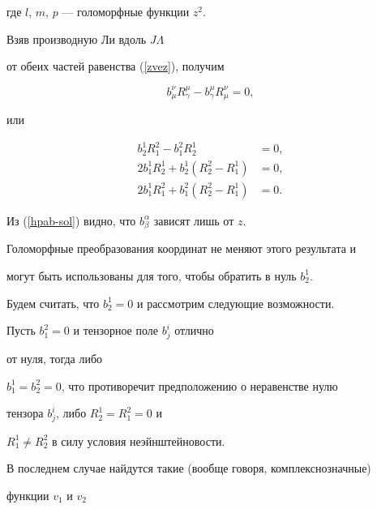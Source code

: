 где $l$, $m$, $p$ --- голоморфные функции $z^2$.


Взяв производную Ли вдоль $J\Lambda$


от обеих частей равенства (\ref{zvez}), получим


\begin{equation}


\label{zvez-b}


b_{\mu}^{\nu} R^{\mu}_{\gamma}-


b_{\gamma}^{\mu} R^{\nu}_{\mu}=0,


\end{equation}


или


\begin{equation}


\begin{split}


\label{zvez-bb}


b_2^1 R^2_1 - b^2_1 R_2^1 &= 0,\\


2 b_1^1 R^1_2 + b^1_2 (R^2_2 - R^1_1) &= 0,\\


2 b^1_1 R^2_1 + b^2_1 (R_2^2 - R^1_1) &= 0.


\end{split}


\end{equation}


Из (\ref{hpab-sol}) видно, что $b^\alpha_\beta$ зависят лишь от $z$.


Голоморфные преобразования координат не меняют этого результата и


могут быть использованы для того, чтобы обратить в нуль $b^1_2$.





Будем считать, что $b^1_2=0$ и рассмотрим следующие возможности.


Пусть $b^2_1=0$ и тензорное поле $b^i_j$ отлично


от нуля, тогда либо


$b^1_1=b^2_2=0$, что противоречит предположению о неравенстве нулю


тензора $b^i_j$, либо $R^1_2=R^2_1=0$ и


$R^1_1 \ne R^2_2$ в силу условия неэйнштейновости.


В последнем случае найдутся такие (вообще говоря, комплекснозначные)


функции $v_1$ и $v_2$


